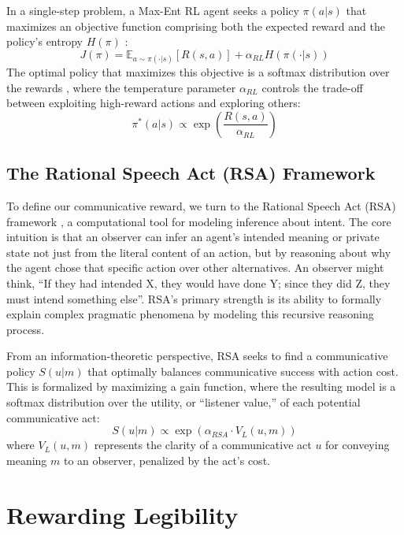 \documentclass{article}
\begin{document}
In a single-step problem, a Max-Ent RL agent seeks a policy $\pi(a|s)$ that maximizes an objective function comprising both the expected reward and the policy's entropy $H(\pi)$ \cite{haarnoja2018soft}:
\begin{equation}
J(\pi)=\mathbb{E}_{a\sim\pi(\cdot|s)}[R(s,a)]+\alpha_{RL}H(\pi(\cdot|s))
\end{equation}
The optimal policy that maximizes this objective is a softmax distribution over the rewards \cite{levine2018reinforcement}, where the temperature parameter $\alpha_{RL}$ controls the trade-off between exploiting high-reward actions and exploring others:
\begin{equation}
\pi^{*}(a|s)\propto \exp\left(\frac{R(s,a)}{\alpha_{RL}}\right)
\end{equation}

\subsection{The Rational Speech Act (RSA) Framework}
\label{ssec:rsa}

To define our communicative reward, we turn to the Rational Speech Act (RSA) framework \cite{goodman2016pragmatic}, a computational tool for modeling inference about intent. The core intuition is that an observer can infer an agent's intended meaning or private state not just from the literal content of an action, but by reasoning about why the agent chose that specific action over other alternatives. An observer might think, ``If they had intended X, they would have done Y; since they did Z, they must intend something else''. RSA's primary strength is its ability to formally explain complex pragmatic phenomena by modeling this recursive reasoning process.

From an information-theoretic perspective, RSA seeks to find a communicative policy $S(u|m)$ that optimally balances communicative success with action cost. This is formalized by maximizing a gain function, where the resulting model is a softmax distribution over the utility, or ``listener value,'' of each potential communicative act:
\begin{equation}
S(u|m)\propto \exp(\alpha_{RSA}\cdot V_{L}(u,m))
\end{equation}
where $V_{L}(u,m)$ represents the clarity of a communicative act $u$ for conveying meaning $m$ to an observer, penalized by the act's cost.

\section{Rewarding Legibility}
\label{sec:pragmatic_reward}
\end{document}
